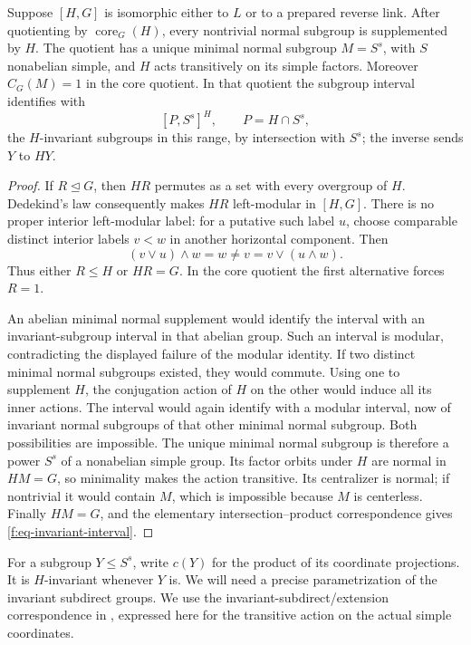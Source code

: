 \begin{proposition}\label{f:prop-monolith}
Suppose $[H,G]$ is isomorphic either to $L$ or to a prepared reverse link.
After quotienting by $\operatorname{core}_G(H)$, every nontrivial normal
subgroup is supplemented by $H$. The quotient has a unique minimal normal
subgroup $M=S^s$, with $S$ nonabelian simple, and $H$ acts transitively on
its simple factors. Moreover $C_G(M)=1$ in the core quotient. In that
quotient the subgroup interval identifies with
\begin{equation}\label{f:eq-invariant-interval}
 [P,S^s]^H,\qquad P=H\cap S^s,
\end{equation}
the $H$-invariant subgroups in this range, by intersection with $S^s$;
the inverse sends $Y$ to $HY$.
\end{proposition}
\begin{proof}
If $R\trianglelefteq G$, then $HR$ permutes as a set with every overgroup of
$H$. Dedekind's law consequently makes $HR$ left-modular in $[H,G]$.
There is no proper interior left-modular label: for a putative such label
$u$, choose comparable distinct interior labels $v<w$ in another horizontal
component. Then
\[
 (v\vee u)\wedge w=w\ne v=v\vee(u\wedge w).
\]
Thus either $R\le H$ or $HR=G$. In the core quotient the first alternative
forces $R=1$.

An abelian minimal normal supplement would identify the interval with
an invariant-subgroup interval in that abelian group. Such an interval is
modular, contradicting the displayed failure of the modular identity.
If two distinct minimal normal subgroups existed, they would commute.
Using one to supplement $H$, the conjugation action of $H$ on the other
would induce all its inner actions. The interval would again identify
with a modular interval, now of invariant normal subgroups of that other
minimal normal subgroup. Both possibilities are impossible. The unique
minimal normal subgroup is therefore a power $S^s$ of a nonabelian simple
group. Its factor orbits under $H$ are normal in $HM=G$, so minimality makes
the action transitive. Its centralizer is normal; if nontrivial it would
contain $M$, which is impossible because $M$ is centerless. Finally $HM=G$,
and the elementary intersection--product correspondence gives
\eqref{f:eq-invariant-interval}.
\end{proof}

For a subgroup $Y\le S^s$, write $c(Y)$ for the product of its coordinate
projections. It is $H$-invariant whenever $Y$ is. We will need a precise
parametrization of the invariant subdirect groups. We use the
invariant-subdirect/extension correspondence in
\citet[Proposition~2.2 and Lemma~2.3]{PalfyTwisted}, expressed here for
the transitive action on the actual simple coordinates.

